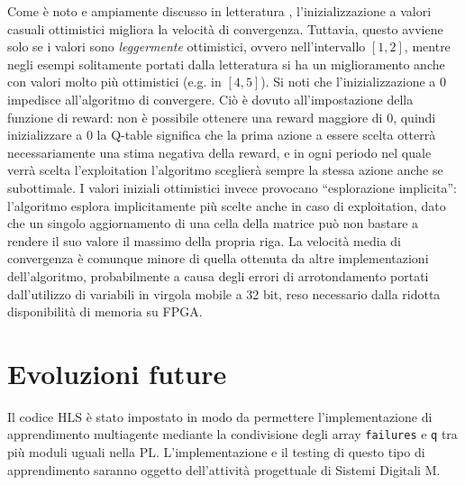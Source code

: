 \documentclass{article}
\begin{document}
	Come è noto e ampiamente discusso in letteratura \citep{sutton_reinforcement_2018}, l'inizializzazione a valori casuali ottimistici migliora la velocità di convergenza. 
  Tuttavia, questo avviene solo se i valori sono \emph{leggermente} ottimistici, ovvero nell'intervallo $[1, 2]$, mentre negli esempi solitamente portati dalla letteratura si ha un miglioramento anche con valori molto più ottimistici (e.g. in $[4, 5]$). 
  Si noti che l'inizializzazione a 0 impedisce all'algoritmo di convergere.
  Ciò è dovuto all'impostazione della funzione di reward: non è possibile ottenere una reward maggiore di 0, quindi inizializzare a 0 la Q-table significa che la prima azione a essere scelta otterrà necessariamente una stima negativa della reward, e in ogni periodo nel quale verrà scelta l'exploitation l'algoritmo sceglierà sempre la stessa azione anche se subottimale.
  I valori iniziali ottimistici invece provocano ``esplorazione implicita'': l'algoritmo esplora implicitamente più scelte anche in caso di exploitation, dato che un singolo aggiornamento di una cella della matrice può non bastare a rendere il suo valore il massimo della propria riga. 
	La velocità media di convergenza è comunque minore di quella ottenuta da altre implementazioni dell'algoritmo, probabilmente a causa degli errori di arrotondamento portati dall'utilizzo di variabili in virgola mobile a 32 bit, reso necessario dalla ridotta disponibilità di memoria su FPGA.
	\section{Evoluzioni future}
	Il codice HLS è stato impostato in modo da permettere l'implementazione di apprendimento multiagente \citep{kretchmar_parallel_2002} mediante la condivisione degli array \texttt{failures} e \texttt{q} tra più moduli uguali nella PL.
	L'implementazione e il testing di questo tipo di apprendimento saranno oggetto dell'attività progettuale di Sistemi Digitali M.
	
	
	
\end{document}
